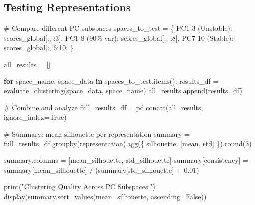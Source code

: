 \documentclass[
  letterpaper,
  DIV=11,
  numbers=noendperiod]{scrartcl}
\newenvironment{Shaded}{\begin{snugshade}}{\end{snugshade}}
\newcommand{\BuiltInTok}[1]{\textcolor[rgb]{0.00,0.23,0.31}{#1}}
\newcommand{\CommentTok}[1]{\textcolor[rgb]{0.37,0.37,0.37}{#1}}
\newcommand{\ControlFlowTok}[1]{\textcolor[rgb]{0.00,0.23,0.31}{\textbf{#1}}}
\newcommand{\DecValTok}[1]{\textcolor[rgb]{0.68,0.00,0.00}{#1}}
\newcommand{\FloatTok}[1]{\textcolor[rgb]{0.68,0.00,0.00}{#1}}
\newcommand{\KeywordTok}[1]{\textcolor[rgb]{0.00,0.23,0.31}{\textbf{#1}}}
\newcommand{\NormalTok}[1]{\textcolor[rgb]{0.00,0.23,0.31}{#1}}
\newcommand{\OperatorTok}[1]{\textcolor[rgb]{0.37,0.37,0.37}{#1}}
\newcommand{\StringTok}[1]{\textcolor[rgb]{0.13,0.47,0.30}{#1}}
\newcommand{\VariableTok}[1]{\textcolor[rgb]{0.07,0.07,0.07}{#1}}
\renewenvironment{Shaded}{%
  \begin{tcolorbox}[%
    enhanced,%
    colback=codebg,%
    colframe=codebg,%
    borderline west={3pt}{0pt}{sectionblue},%
    fontupper=\small\ttfamily,%
    boxrule=0pt,%
    arc=0pt,%
    boxsep=5pt,%
    left=2mm,%
    right=2mm,%
    top=2mm,%
    bottom=2mm%
  ]%
}{%
  \end{tcolorbox}%
}
\begin{document}
\subsection{Testing Representations}\label{testing-representations}

\begin{Shaded}
\begin{Highlighting}[]
\CommentTok{\# Compare different PC subspaces}
\NormalTok{spaces\_to\_test }\OperatorTok{=}\NormalTok{ \{}
    \StringTok{\textquotesingle{}PC1{-}3 (Unstable)\textquotesingle{}}\NormalTok{: scores\_global[:, :}\DecValTok{3}\NormalTok{],}
    \StringTok{\textquotesingle{}PC1{-}8 (90\% var)\textquotesingle{}}\NormalTok{: scores\_global[:, :}\DecValTok{8}\NormalTok{],}
    \StringTok{\textquotesingle{}PC7{-}10 (Stable)\textquotesingle{}}\NormalTok{: scores\_global[:, }\DecValTok{6}\NormalTok{:}\DecValTok{10}\NormalTok{]}
\NormalTok{\}}

\NormalTok{all\_results }\OperatorTok{=}\NormalTok{ []}

\ControlFlowTok{for}\NormalTok{ space\_name, space\_data }\KeywordTok{in}\NormalTok{ spaces\_to\_test.items():}
\NormalTok{    results\_df }\OperatorTok{=}\NormalTok{ evaluate\_clustering(space\_data, space\_name)}
\NormalTok{    all\_results.append(results\_df)}

\CommentTok{\# Combine and analyze}
\NormalTok{full\_results\_df }\OperatorTok{=}\NormalTok{ pd.concat(all\_results, ignore\_index}\OperatorTok{=}\VariableTok{True}\NormalTok{)}

\CommentTok{\# Summary: mean silhouette per representation}
\NormalTok{summary }\OperatorTok{=}\NormalTok{ full\_results\_df.groupby(}\StringTok{\textquotesingle{}representation\textquotesingle{}}\NormalTok{).agg(\{}
    \StringTok{\textquotesingle{}silhouette\textquotesingle{}}\NormalTok{: [}\StringTok{\textquotesingle{}mean\textquotesingle{}}\NormalTok{, }\StringTok{\textquotesingle{}std\textquotesingle{}}\NormalTok{]}
\NormalTok{\}).}\BuiltInTok{round}\NormalTok{(}\DecValTok{3}\NormalTok{)}

\NormalTok{summary.columns }\OperatorTok{=}\NormalTok{ [}\StringTok{\textquotesingle{}mean\_silhouette\textquotesingle{}}\NormalTok{, }\StringTok{\textquotesingle{}std\_silhouette\textquotesingle{}}\NormalTok{]}
\NormalTok{summary[}\StringTok{\textquotesingle{}consistency\textquotesingle{}}\NormalTok{] }\OperatorTok{=}\NormalTok{ summary[}\StringTok{\textquotesingle{}mean\_silhouette\textquotesingle{}}\NormalTok{] }\OperatorTok{/}\NormalTok{ (summary[}\StringTok{\textquotesingle{}std\_silhouette\textquotesingle{}}\NormalTok{] }\OperatorTok{+} \FloatTok{0.01}\NormalTok{)}

\BuiltInTok{print}\NormalTok{(}\StringTok{"Clustering Quality Across PC Subspaces:"}\NormalTok{)}
\NormalTok{display(summary.sort\_values(}\StringTok{\textquotesingle{}mean\_silhouette\textquotesingle{}}\NormalTok{, ascending}\OperatorTok{=}\VariableTok{False}\NormalTok{))}
\end{Highlighting}
\end{Shaded}
\end{document}
